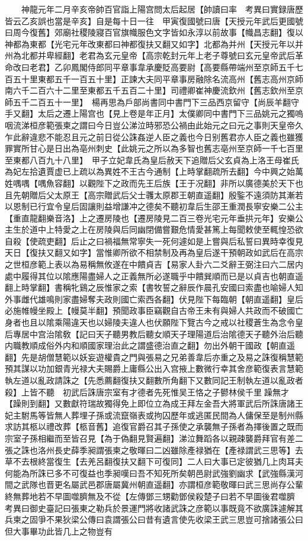 　　神龍元年二月辛亥帝帥百官詣上陽宫問太后起居【帥讀曰率　考異曰實録唐歷皆云乙亥誤也當是辛亥】自是每十日一往　甲寅復國號曰唐【天授元年武后更國號曰周今復舊】郊廟社稷陵寢百官旗幟服色文字皆如永淳以前故事【幟昌志翻】復以神都為東都【光宅元年改東都曰神都復扶又翻又如字】北都為并州【天授元年以并州為北都并卑經翻】老君為玄元皇帝【高宗乾封元年上老子尊號曰玄元皇帝武后革命改曰老君】乙卯鳳閣侍郎同平章事韋承慶貶高要尉【高要縣帶端州至京師五千七百五十里東都五千一百五十里】正諫大夫同平章事房融除名流高州【舊志高州京師南六千二百六十二里至東都五千五百二十里】司禮卿崔神慶流欽州【舊志欽州至京師五千二百五十一里】　楊再思為戶部尚書同中書門下三品西京留守【尚辰羊翻守手又翻】太后之遷上陽宫也【見上卷是年正月】太僕卿同中書門下三品姚元之獨嗚咽流涕桓彦範張柬之謂曰今日豈公涕泣時邪恐公禍由此始元之曰元之事則天皇帝久乍此辭違悲不能忍且元之前日從公誅姦逆人臣之義也今日别舊君亦人臣之義也雖獲罪實所甘心是日出為亳州刺史【此姚元之所以為多智也舊志亳州至京師一千七百里至東都八百九十八里】　甲子立妃韋氏為皇后赦天下追贈后父玄貞為上洛王母崔氏為妃左拾遺賈虚已上疏以為異姓不王古今通制【上時掌翻疏所去翻】今中興之始萬姓喁喁【喁魚容翻】以觀陛下之政而先王后族【王于况翻】非所以廣德美於天下也且先朝贈后父太原王【高宗贈武后父士彠太原郡王朝直遥翻】殷鍳不遠須防其漸若以恩制已行宜令皇后固讓則益增謙冲之德矣不聽初韋后生邵王重潤長寧安樂二公主【重直龍翻樂音洛】上之遷房陵也【遷房陵見二百三卷光宅元年垂拱元年】安樂公主生於道中上特愛之上在房陵與后同幽閉備嘗艱危情愛甚篤上每聞敕使至輒惶恐欲自殺【使疏吏翻】后止之曰禍福無常寧失一死何遽如是上嘗與后私誓曰異時幸復見天日【復扶又翻又如字】當惟卿所欲不相禁制及再為皇后遂干預朝政如武后在高宗之世桓彦範上表以為易稱無攸遂在中饋貞吉【易家人卦六二爻辭王弼注曰六二居内處中履得其位以隂應陽盡婦人之正義無所必遂職乎中饋巽順而已是以貞吉也朝直遥翻上時掌翻】書稱牝鷄之辰惟家之索【書牧誓之辭辰作晨孔安國曰索盡也喻婦人知外事雌代雄鳴則家盡婦奪夫政則國亡索西各翻】伏見陛下每臨朝【朝直遥翻】皇后必施帷幔坐殿上【幔莫半翻】預聞政事臣竊觀自古帝王未有與婦人共政而不破國亡身者也且以隂乘陽違天也以婦陵夫違人也伏願陛下覽古今之戒以社稷蒼生為念令皇后專居中宫治隂敎【記曰天子聽男教后聽女順天子理陽道后治隂德天子聽外治后聽内職教順成俗外内和順國家理治此之謂盛德治直之翻】勿出外朝干國政【朝直遥翻】先是胡僧慧範以妖妄遊權貴之門與張易之兄弟善韋后亦重之及易之誅復稱慧範預其謀以功加銀青光禄大夫賜爵上庸縣公出入宫掖上數微行幸其舍彦範復表言慧範執左道以亂政請誅之【先悉薦翻復扶又翻數所角翻下又數同記王制執左道以亂政者殺】上皆不聽　初武后誅唐宗室有才德者先死惟吴王恪之子鬰林侯千里躁無才【躁則到翻】又數獻符瑞故獨得免上即位立為成王拜左金吾大將軍武后所誅唐諸王妃主駙馬等皆無人葬埋子孫或流竄嶺表或拘囚歷年或逃匿民間為人傭保至是制州縣求訪其柩以禮改葬【柩音舊】追復官爵召其子孫使之承襲無子孫者為擇後置之既而宗室子孫相繼而至皆召見【為于偽翻見賢遍翻】涕泣舞蹈各以親疎襲爵拜官有差二張之誅也洛州長史薛季昶謂張柬之敬暉曰二凶雖除產禄猶在【產禄謂武三思等】去草不去根終當復生【去羌呂翻復扶又翻下可復同】二人曰大事已定彼猶几上肉耳夫何能為所誅已多不可復益也季昶嘆曰吾不知死所矣朝邑尉武強劉幽求【武強縣漢河間之武隊也晋更名屬武邑郡唐屬冀州朝直遥翻】亦謂桓彦範敬暉曰武三思尚存公輩終無葬地若不早圖噬臍無及不從【左傳鄧三甥勸鄧侯殺楚子曰若不早圖後君噬臍　考異曰御史臺記曰張東之勒兵於景運門將收諸武誅之彦範以事既竟不欲廣誅遽解其兵柬之固爭不果狄梁公傳曰袁謂張公曰昔有遺言使先收梁王武三思豈可捨諸張公曰但大事畢功此皆几上之物豈有